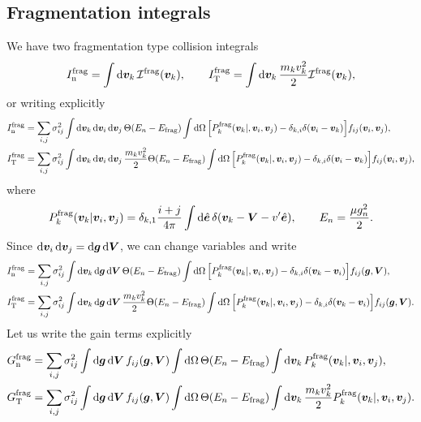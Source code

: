 \documentclass[aps,prl,preprint,groupedaddress,10pt]{revtex4-2}
\begin{document}
\subsection{Fragmentation integrals}
We have two fragmentation type collision integrals
\begin{equation}
    I_{\mathrm{n}}^{\mathrm{frag}} = \int\dd{\vb*{v}_k}\mathcal{I}^{\mathrm{frag}}(\vb*{v}_k),\qquad
    I_{\mathrm{T}}^{\mathrm{frag}} = \int\dd{\vb*{v}_k}\frac{m_kv_k^2}{2}\mathcal{I}^{\mathrm{frag}}(\vb*{v}_k),
\end{equation}
or writing explicitly
\begin{equation}
    \begin{split}
        \lutx{I}{n}{frag} &= \sum_{i,j}\sigma_{ij}^2\int\dd{\bv_k}\dd{\bv_i}\dd{\bv_j}
        \Theta\pqty{E_n-\ltx{E}{frag}}\int\dd{\Omega}
        \bqty{\utx{P}{frag}_k(\bv_k\vert,\bv_i,\bv_j)-\delta_{k,i}\delta(\bv_i-\bv_k)}
        f_{ij}\pqty{\bv_i,\bv_j},\\
        \lutx{I}{T}{frag} &= \sum_{i,j}\sigma_{ij}^2\int\dd{\bv_k}\dd{\bv_i}\dd{\bv_j}
        \frac{m_kv_k^2}{2}\Theta\pqty{E_n-\ltx{E}{frag}}\int\dd{\Omega}
        \bqty{\utx{P}{frag}_k(\bv_k\vert,\bv_i,\bv_j)-\delta_{k,i}\delta(\bv_i-\bv_k)}
        f_{ij}\pqty{\bv_i,\bv_j},
    \end{split}
\end{equation}
where
\begin{equation}
    \utx{P}{frag}_k\pqty{\bv_k\vert\bv_i,\bv_j}=
    \delta_{k,1}\frac{i+j}{4\pi}\int\dd{\be}\delta\pqty{\bv_k-\bV-v'\be},
    \qquad E_n=\frac{\mu g_n^2}{2}.
\end{equation}
Since $\dd{\vb*{v}_i}\dd{\vb*{v}_j}=\dd{\vb*{g}}\dd{\vb*{V}}$, we can change variables and write
\begin{equation}
    \begin{split}
        \lutx{I}{n}{frag} &= \sum_{i,j}\sigma_{ij}^2\int\dd{\bv_k}\dd{\bg}\dd{\bV}
        \Theta\pqty{E_n-\ltx{E}{frag}}\int\dd{\Omega}
        \bqty{\utx{P}{frag}_k(\bv_k\vert,\bv_i,\bv_j)-\delta_{k,i}\delta(\bv_k-\bv_i)}
        f_{ij}\pqty{\bg,\bV},\\
        \lutx{I}{T}{frag} &= \sum_{i,j}\sigma_{ij}^2\int\dd{\bv_k}\dd{\bg}\dd{\bV}
        \frac{m_kv_k^2}{2}\Theta\pqty{E_n-\ltx{E}{frag}}\int\dd{\Omega}
        \bqty{\utx{P}{frag}_k(\bv_k\vert,\bv_i,\bv_j)-\delta_{k,i}\delta(\bv_k-\bv_i)}
        f_{ij}\pqty{\bg,\bV}.
    \end{split}
\end{equation}
Let us write the gain terms explicitly
\begin{equation}
    \begin{split}
        \lutx{G}{n}{frag} &= \sum_{i,j}\sigma_{ij}^2\int\dd{\bg}\dd{\bV}
        f_{ij}\pqty{\bg,\bV}\int\dd{\Omega}\Theta\pqty{E_n-\ltx{E}{frag}}
        \int\dd{\bv_k}\utx{P}{frag}_k(\bv_k\vert,\bv_i,\bv_j),\\
        \lutx{G}{T}{frag} &= \sum_{i,j}\sigma_{ij}^2\int\dd{\bg}\dd{\bV}
        f_{ij}\pqty{\bg,\bV}\int\dd{\Omega}\Theta\pqty{E_n-\ltx{E}{frag}}
        \int\dd{\bv_k}\frac{m_kv_k^2}{2}\utx{P}{frag}_k(\bv_k\vert,\bv_i,\bv_j).
    \end{split}
\end{equation}
\end{document}
